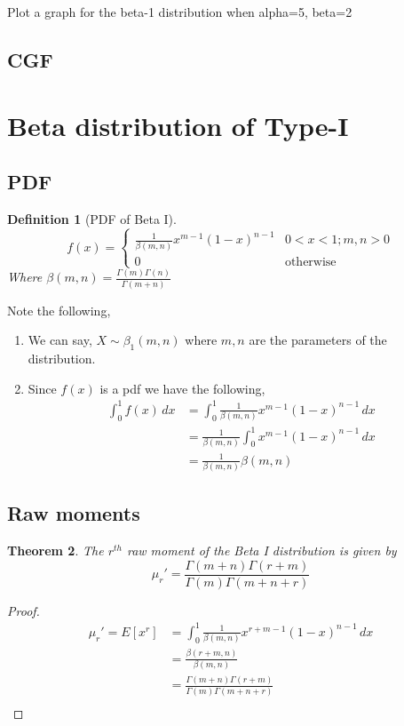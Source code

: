 \documentclass[oneside,11pt,pdftex]{book}%
\numberwithin{equation}{section}
\newtheorem{theorem}{Theorem}[chapter]%
\newtheorem{definition}[theorem]{Definition}
\numberwithin{section}{chapter}
\numberwithin{equation}{chapter}
\begin{document}
Plot a graph for the beta-1 distribution when alpha=5, beta=2
\subsection{CGF}

\section{Beta distribution of Type-I}
\subsection{PDF}
\begin{definition}[PDF of Beta I]
	\[ f(x)=\begin{cases}
		\frac{1}{\beta(m,n)}x^{m-1}(1-x)^{n-1} & 0<x<1; m,n>0\\
		0 & \text{otherwise}
	\end{cases} \]
	Where $ \beta(m,n) = \frac{\Gamma(m)\Gamma(n)}{\Gamma(m+n)}$
\end{definition}
Note the following,
\begin{enumerate}
	\item We can say, $ X \sim \beta_1 (m,n) $ where $ m,n $ are the parameters of the distribution.
	\item Since $ f(x) $ is a pdf we have the following,
	\begin{align*}
		\int_0^1 f(x)\, dx &= \int_0^1 \frac{1}{\beta(m,n)} x^{m-1} (1-x)^{n-1}\, dx\\
		&=\frac{1}{\beta(m,n)} \int_0^1 x^{m-1}(1-x)^{n-1}\, dx\\
		&=\frac{1}{\beta(m,n)}\beta(m,n)
	\end{align*}
\end{enumerate}

\subsection{Raw moments}
\begin{theorem}
	The $ r^{th}$ raw moment of the Beta I distribution is given by \[ \mu_r'=\frac{\Gamma(m+n)\Gamma(r+m)}{\Gamma(m)\Gamma(m+n+r)} \]
\end{theorem}
\begin{proof}
	\begin{align*}
		\mu_{r}'=E[x^r]&=\int_0^1 \frac{1}{\beta(m,n)} x^{r+m-1}(1-x)^{n-1}\, dx\\
		&=\frac{\beta(r+m,n)}{\beta(m,n)}\\
		&=\frac{\Gamma(m+n)\Gamma(r+m)}{\Gamma(m)\Gamma(m+n+r)}\\
	\end{align*}
\end{proof}
\end{document}

